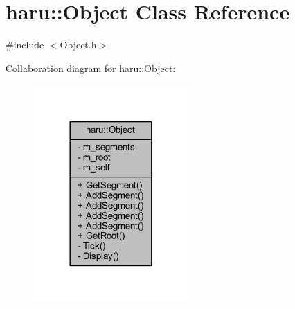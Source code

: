 \hypertarget{classharu_1_1_object}{}\section{haru\+:\+:Object Class Reference}
\label{classharu_1_1_object}


{\ttfamily \#include $<$Object.\+h$>$}



Collaboration diagram for haru\+:\+:Object\+:\nopagebreak
\begin{figure}[H]
\begin{center}
\leavevmode
\includegraphics[width=168pt]{classharu_1_1_object__coll__graph}
\end{center}
\end{figure}
